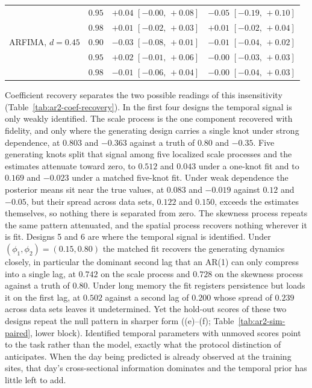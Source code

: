 \documentclass[12pt]{article}
\begin{document}
\begin{table}[htbp]
\begin{tabular}{@{}ll cc@{}}
 & $0.95$ & $+0.04$ {\tiny $[-0.00,\,+0.08]$} & $-0.05$ {\tiny $[-0.19,\,+0.10]$} \\
 & $0.98$ & $+0.01$ {\tiny $[-0.02,\,+0.03]$} & $+0.01$ {\tiny $[-0.02,\,+0.04]$} \\
\addlinespace
ARFIMA, $d = 0.45$ & $0.90$ & $-0.03$ {\tiny $[-0.08,\,+0.01]$} & $-0.01$ {\tiny $[-0.04,\,+0.02]$} \\
 & $0.95$ & $+0.02$ {\tiny $[-0.01,\,+0.06]$} & $-0.00$ {\tiny $[-0.03,\,+0.03]$} \\
 & $0.98$ & $-0.01$ {\tiny $[-0.06,\,+0.04]$} & $-0.00$ {\tiny $[-0.04,\,+0.03]$} \\
\bottomrule
\end{tabular}
\end{table}

Coefficient recovery separates the two possible readings of this insensitivity (Table~\ref{tab:ar2-coef-recovery}).  In the first four designs the temporal signal is only weakly identified.  The scale process is the one component recovered with fidelity, and only where the generating design carries a single knot under strong dependence, at $0.803$ and $-0.363$ against a truth of $0.80$ and $-0.35$.  Five generating knots split that signal among five localized scale processes and the estimates attenuate toward zero, to $0.512$ and $0.043$ under a one-knot fit and to $0.169$ and $-0.023$ under a matched five-knot fit.  Under weak dependence the posterior means sit near the true values, at $0.083$ and $-0.019$ against $0.12$ and $-0.05$, but their spread across data sets, $0.122$ and $0.150$, exceeds the estimates themselves, so nothing there is separated from zero.  The skewness process repeats the same pattern attenuated, and the spatial process recovers nothing wherever it is fit.  Designs 5 and 6 are where the temporal signal is identified.  Under $(\phi_1, \phi_2) = (0.15, 0.80)$ the matched fit recovers the generating dynamics closely, in particular the dominant second lag that an AR(1) can only compress into a single lag, at $0.742$ on the scale process and $0.728$ on the skewness process against a truth of $0.80$.  Under long memory the fit registers persistence but loads it on the first lag, at $0.502$ against a second lag of $0.200$ whose spread of $0.239$ across data sets leaves it undetermined.  Yet the hold-out scores of these two designs repeat the null pattern in sharper form ((e)--(f); Table~\ref{tab:ar2-sim-paired}, lower block).  Identified temporal parameters with unmoved scores point to the task rather than the model, exactly what the protocol distinction of  anticipates.  When the day being predicted is already observed at the training sites, that day's cross-sectional information dominates and the temporal prior has little left to add.
\end{document}

